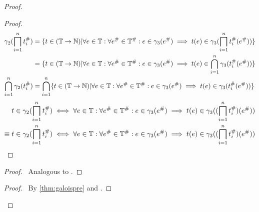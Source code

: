 \begin{proof}
\begin{proof}
\begin{align}
            \concrete_2 (\bigsqcap_{i = 1}^n t_i^\#)
            &= \{t \in (\mathbb{T} \rightarrow \mathbb{N}) | \forall e \in \mathbb{T} : \forall e^\# \in \mathbb{T}^\# : e \in \concrete_3(e^\#) \implies t(e) \in \concrete_3(\bigsqcap_{i = 1}^n t^\#_i(e^\#)) \} \\
            &= \{t \in (\mathbb{T} \rightarrow \mathbb{N}) | \forall e \in \mathbb{T} : \forall e^\# \in \mathbb{T}^\# : e \in \concrete_3(e^\#) \implies t(e) \in \bigcap_{i = 1}^n \concrete_3(t^\#_i(e^\#)) \} \\
            \bigcap_{i = 1}^n \concrete_2 (t_i^\#)
            &= \bigcap_{i = 1}^n \{t \in (\mathbb{T} \rightarrow \mathbb{N}) | \forall e \in \mathbb{T} : \forall e^\# \in \mathbb{T}^\# : e \in \concrete_3(e^\#) \implies t(e) \in \concrete_3(t^\#_i(e^\#)) \} \\
        \end{align}
        \begin{align}
            t \in \concrete_2 (\bigsqcap_{i = 1}^n t_i^\#) \iff \forall e \in \mathbb{T} : \forall e^\# \in \mathbb{T}^\# : e \in \concrete_3(e^\#) \implies t(e) \in \concrete_3((\bigsqcap_{i = 1}^n t^\#_i)(e^\#)) \\
            \equiv
            t \in \concrete_2 (\bigsqcap_{i = 1}^n t_i^\#) \iff \forall e \in \mathbb{T} : \forall e^\# \in \mathbb{T}^\# : e \in \concrete_3(e^\#) \implies t(e) \in \concrete_3((\bigsqcap_{i = 1}^n t^\#_i)(e^\#)) \\
        \end{align}
    \end{proof}
    \begin{proof}
        \pf\ Analogous to .
    \end{proof}
    \qedstep
    \begin{proof}
        \pf\ By \autoref{thm:galoispre} and .
    \end{proof}
\end{proof}
